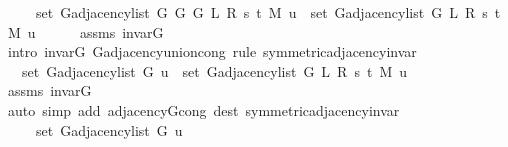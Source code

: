 \begin{isabellebody}
\ \ \ \ \ set\ {\isacharparenleft}{\kern0pt}G{\isachardot}{\kern0pt}adjacency{\isacharunderscore}{\kern0pt}list\ {\isacharparenleft}{\kern0pt}G{}\ G\ {\isacharparenleft}{\kern0pt}G{}\ L\ R\ s\ t\ M{\isacharparenright}{\kern0pt}{\isacharparenright}{\kern0pt}\ u{\isacharparenright}{\kern0pt}\ {\isasymunion}\ set\ {\isacharparenleft}{\kern0pt}G{\isachardot}{\kern0pt}adjacency{\isacharunderscore}{\kern0pt}list\ {\isacharparenleft}{\kern0pt}G{}\ L\ R\ s\ t\ M{\isacharparenright}{\kern0pt}\ u{\isacharparenright}{\kern0pt}{\isachardoublequoteclose}\isanewline
\ \ \ \ \isamarkupfalse%
\ assms{\isacharparenleft}{\kern0pt}{}{\isacharparenright}{\kern0pt}\ invar{\isacharunderscore}{\kern0pt}G{}\isanewline
\ \ \ \ \isamarkupfalse%
\ {\isacharparenleft}{\kern0pt}intro\ invar{\isacharunderscore}{\kern0pt}G{}\ G{\isachardot}{\kern0pt}adjacency{\isacharunderscore}{\kern0pt}union{\isacharunderscore}{\kern0pt}cong{\isacharparenright}{\kern0pt}\ {\isacharparenleft}{\kern0pt}rule\ symmetric{\isacharunderscore}{\kern0pt}adjacency{\isachardot}{\kern0pt}invar{\isacharparenright}{\kern0pt}\isanewline
\ \ \isamarkupfalse%
\ \isamarkupfalse%
\ {\isachardoublequoteopen}{\isachardot}{\kern0pt}{\isachardot}{\kern0pt}{\isachardot}{\kern0pt}\ {\isacharequal}{\kern0pt}\ set\ {\isacharparenleft}{\kern0pt}G{\isachardot}{\kern0pt}adjacency{\isacharunderscore}{\kern0pt}list\ G\ u{\isacharparenright}{\kern0pt}\ {\isasymunion}\ set\ {\isacharparenleft}{\kern0pt}G{\isachardot}{\kern0pt}adjacency{\isacharunderscore}{\kern0pt}list\ {\isacharparenleft}{\kern0pt}G{}\ L\ R\ s\ t\ M{\isacharparenright}{\kern0pt}\ u{\isacharparenright}{\kern0pt}{\isachardoublequoteclose}\isanewline
\ \ \ \ \isamarkupfalse%
\ assms{\isacharparenleft}{\kern0pt}{}{\isacharparenright}{\kern0pt}\ invar{\isacharunderscore}{\kern0pt}G{}\isanewline
\ \ \ \ \isamarkupfalse%
\ {\isacharparenleft}{\kern0pt}auto\ simp\ add{\isacharcolon}{\kern0pt}\ adjacency{\isacharunderscore}{\kern0pt}G{}{\isacharunderscore}{\kern0pt}cong\ dest{\isacharcolon}{\kern0pt}\ symmetric{\isacharunderscore}{\kern0pt}adjacency{\isachardot}{\kern0pt}invar{\isacharparenright}{\kern0pt}\isanewline
\ \ \isamarkupfalse%
\ \isamarkupfalse%
\isanewline
\ \ \ \ {\isachardoublequoteopen}{\isachardot}{\kern0pt}{\isachardot}{\kern0pt}{\isachardot}{\kern0pt}\ {\isacharequal}{\kern0pt}\isanewline
\ \ \ \ \ set\ {\isacharparenleft}{\kern0pt}G{\isachardot}{\kern0pt}adjacency{\isacharunderscore}{\kern0pt}list\ G\ u{\isacharparenright}{\kern0pt}\ {\isasymunion}\isanewline

\end{isabellebody}
